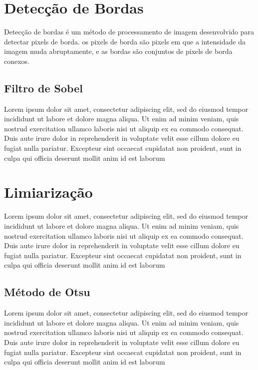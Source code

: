 \section{Detecção de Bordas}
\label{sec:detecbordas}

Detecção de bordas é um método de processamento de imagem desenvolvido para detectar pixels de borda. os pixels de borda são pixels em que a intensidade da imagem muda abruptamente, e as bordas são conjuntos de pixels de borda conexos.\cite{gonzalez1977digital}

\subsection{Filtro de Sobel}
\label{sec:sobel}

Lorem ipsum dolor sit amet, consectetur adipiscing elit, sed do eiusmod tempor incididunt ut labore et dolore magna aliqua. Ut enim ad minim veniam, quis nostrud exercitation ullamco laboris nisi ut aliquip ex ea commodo consequat. Duis aute irure dolor in reprehenderit in voluptate velit esse cillum dolore eu fugiat nulla pariatur. Excepteur sint occaecat cupidatat non proident, sunt in culpa qui officia deserunt mollit anim id est laborum

\section{Limiarização}
\label{sec:limiarizacao}

Lorem ipsum dolor sit amet, consectetur adipiscing elit, sed do eiusmod tempor incididunt ut labore et dolore magna aliqua. Ut enim ad minim veniam, quis nostrud exercitation ullamco laboris nisi ut aliquip ex ea commodo consequat. Duis aute irure dolor in reprehenderit in voluptate velit esse cillum dolore eu fugiat nulla pariatur. Excepteur sint occaecat cupidatat non proident, sunt in culpa qui officia deserunt mollit anim id est laborum

\subsection{Método de Otsu}
\label{sec:otsu}

Lorem ipsum dolor sit amet, consectetur adipiscing elit, sed do eiusmod tempor incididunt ut labore et dolore magna aliqua. Ut enim ad minim veniam, quis nostrud exercitation ullamco laboris nisi ut aliquip ex ea commodo consequat. Duis aute irure dolor in reprehenderit in voluptate velit esse cillum dolore eu fugiat nulla pariatur. Excepteur sint occaecat cupidatat non proident, sunt in culpa qui officia deserunt mollit anim id est laborum

